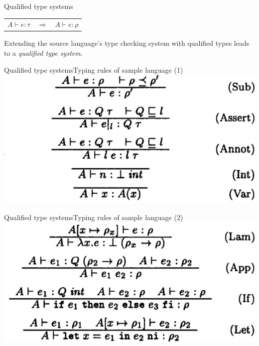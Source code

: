 \documentclass{beamer}
\begin{document}


\begin{frame}{Qualified type systems}
  \begin{center}\Large
  \begin{tabular}{l c r}
    $A \vdash e : \tau$ & $\Rightarrow$ & $A \vdash e : \rho$
  \end{tabular}
  \end{center}

  \vspace{1em}
  \large
  Extending the source language's type checking system with qualified types leads to a \emph{qualified type system}.
\end{frame}

\begin{frame}{Qualified type systems}{Typing rules of sample language (1)}
  \includegraphics[scale=0.4]{paper_samplelang_typingrules1.png}
\end{frame}


\begin{frame}{Qualified type systems}{Typing rules of sample language (2)}
  \includegraphics[scale=0.4]{paper_samplelang_typingrules2.png}
\end{frame}
\end{document}
